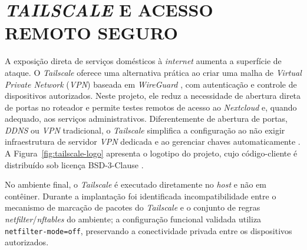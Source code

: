 \begin{figure}[H]
    \centering
    \vspace{0.4em}
\end{figure}

\section{\textit{TAILSCALE} E ACESSO REMOTO SEGURO}

A exposição direta de serviços domésticos à \textit{internet} aumenta a superfície de ataque. O \textit{Tailscale} oferece uma alternativa prática ao criar uma malha de \textit{Virtual Private Network} (\textit{VPN}) baseada em \textit{WireGuard} \cite{tailscale2026}, com autenticação e controle de dispositivos autorizados. Neste projeto, ele reduz a necessidade de abertura direta de portas no roteador e permite testes remotos de acesso ao \textit{Nextcloud} e, quando adequado, aos serviços administrativos. Diferentemente de abertura de portas, \textit{DDNS} ou \textit{VPN} tradicional, o \textit{Tailscale} simplifica a configuração ao não exigir infraestrutura de servidor \textit{VPN} dedicada e ao gerenciar chaves automaticamente \cite{tailscalehowworks}. A Figura~\ref{fig:tailscale-logo} apresenta o logotipo do projeto, cujo código-cliente é distribuído sob licença BSD-3-Clause \cite{tailscalebsd2026}.

\begin{figure}[H]
    \centering
    \vspace{0.4em}
\end{figure}

No ambiente final, o \textit{Tailscale} é executado diretamente no \textit{host} e não em contêiner. Durante a implantação foi identificada incompatibilidade entre o mecanismo de marcação de pacotes do \textit{Tailscale} e o conjunto de regras \textit{netfilter}/\textit{nftables} do ambiente; a configuração funcional validada utiliza \texttt{netfilter-mode=off}, preservando a conectividade privada entre os dispositivos autorizados.


